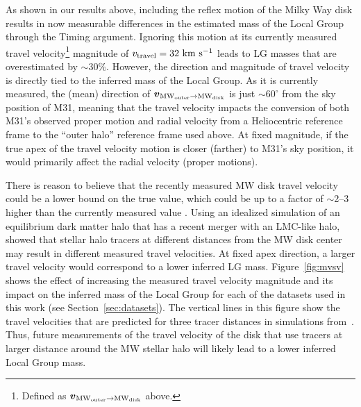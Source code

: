 \documentclass[twocolumn]{aastex631}
\newcommand{\kc}[1]{\textcolor{pink}{\textbf{#1}} }
\newcommand{\bov}{\ensuremath{\boldsymbol{v}}}
\newcommand{\vel}[2]{\ensuremath{\bov_{\rm #1 \to #2}}}
\newcommand{\mwouter}{\ensuremath{\textrm{MW}_\textrm{outer}}}
\newcommand{\mwdisk}{\ensuremath{\textrm{MW}_\textrm{disk}}}
\begin{document}
As shown in our results above, including the reflex motion of the Milky Way disk
results in now measurable differences in the estimated mass of the Local Group
through the Timing argument.
Ignoring this motion at its currently measured travel velocity\footnote{Defined
as $\vel{\mwouter}{\mwdisk}$ above.} magnitude of $v_\textrm{travel} = 32~\mathrm{km}~\mathrm{s}^{-1}$
\citep{Petersen2021} leads to LG masses that are overestimated by $\sim30\%$.
However, the direction and magnitude of travel velocity is directly tied to the
inferred mass of the Local Group.
As it is currently measured, the (mean) direction of $\vel{\mwouter}{\mwdisk}$
is just $\sim$$60^\circ$ from the sky position of M31, meaning that the travel
velocity impacts the conversion of both M31's observed proper motion and radial
velocity from a Heliocentric reference frame to the ``outer halo'' reference
frame used above.
At fixed magnitude, if the true apex of the travel velocity motion is closer
(farther) to M31's sky position, it would primarily affect the radial velocity
(proper motions).



There is reason to believe that the recently measured MW disk travel velocity
could be a lower bound on the true value, which could be up to a factor of
$\sim$2--3 higher than the currently measured value
\cite{Garavito-Camargo2021b}.
Using an idealized simulation of an equilibrium dark matter halo that has a
recent merger with an LMC-like halo, \cite{Garavito-Camargo2021b} showed that
stellar halo tracers at different distances from the MW disk center may result
in different measured travel velocities.
At fixed apex direction, a larger travel velocity would correspond to a lower
inferred LG mass.
Figure~\ref{fig:mvsv} shows the effect of increasing the measured travel
velocity magnitude and its impact on the inferred mass of the Local Group for
each of the datasets used in this work (see Section~\ref{sec:datasets}).
The vertical lines in this figure show the travel velocities that are predicted
for three tracer distances in simulations from~\cite{Garavito-Camargo2021b}.
Thus, future measurements of the travel velocity of the disk that use tracers at
larger distance around the MW stellar halo will likely lead to a lower inferred
Local Group mass.
\end{document}

